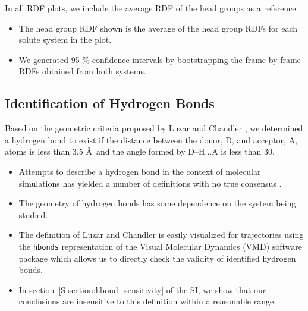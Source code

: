 \documentclass{article}
\begin{document}
  In all RDF plots, we include the average RDF of the head groups as a reference.
  \begin{itemize}
    \item The head group RDF shown is the average of the head group RDFs for each
    solute system in the plot.
    \item We generated 95 \% confidence intervals by bootstrapping the frame-by-frame
    RDFs obtained from both systems.
  \end{itemize}
  
  \subsection*{Identification of Hydrogen Bonds}\label{method:hbonds}

  Based on the geometric criteria proposed by Luzar and Chandler \cite{luzar_effect_1996},
  we determined a hydrogen bond to exist if the distance between the donor, D, and acceptor,
  A, atoms is less than 3.5 \AA~and the angle formed by D--H...A is less than 30\degree.
  \begin{itemize}
    \item Attempts to describe a hydrogen bond in the context of molecular simulations has
    yielded a number of definitions with no true consensus \cite{prada-gracia_quest_2013}.
	\item The geometry of hydrogen bonds has some dependence on the system being studied. 
    \item The definition of Luzar and Chandler is easily visualized for trajectories using
    the \texttt{hbonds} representation of the Visual Molecular Dynamics (VMD) software 
    package which allows us to directly check the validity of identified hydrogen bonds.
    \item In section~\ref{S-section:hbond_sensitivity} of the SI, we show that our 
    conclusions are insensitive to this definition within a reasonable range.
  \end{itemize}
\end{document}
